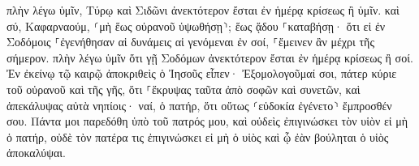 \documentclass{openreader}
\begin{document}
πλὴν λέγω ὑμῖν, Τύρῳ καὶ Σιδῶνι ἀνεκτότερον ἔσται ἐν ἡμέρᾳ κρίσεως ἢ ὑμῖν. 
καὶ σύ, Καφαρναούμ, ⸂μὴ ἕως οὐρανοῦ ὑψωθήσῃ⸃; ἕως ᾅδου ⸀καταβήσῃ· ὅτι εἰ ἐν Σοδόμοις ⸀ἐγενήθησαν αἱ δυνάμεις αἱ γενόμεναι ἐν σοί, ⸀ἔμεινεν ἂν μέχρι τῆς σήμερον. 
πλὴν λέγω ὑμῖν ὅτι γῇ Σοδόμων ἀνεκτότερον ἔσται ἐν ἡμέρᾳ κρίσεως ἢ σοί. 
Ἐν ἐκείνῳ τῷ καιρῷ ἀποκριθεὶς ὁ Ἰησοῦς εἶπεν· Ἐξομολογοῦμαί σοι, πάτερ κύριε τοῦ οὐρανοῦ καὶ τῆς γῆς, ὅτι ⸀ἔκρυψας ταῦτα ἀπὸ σοφῶν καὶ συνετῶν, καὶ ἀπεκάλυψας αὐτὰ νηπίοις· 
ναί, ὁ πατήρ, ὅτι οὕτως ⸂εὐδοκία ἐγένετο⸃ ἔμπροσθέν σου. 
Πάντα μοι παρεδόθη ὑπὸ τοῦ πατρός μου, καὶ οὐδεὶς ἐπιγινώσκει τὸν υἱὸν εἰ μὴ ὁ πατήρ, οὐδὲ τὸν πατέρα τις ἐπιγινώσκει εἰ μὴ ὁ υἱὸς καὶ ᾧ ἐὰν βούληται ὁ υἱὸς ἀποκαλύψαι. 
\end{document}
